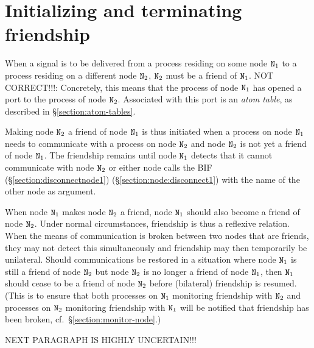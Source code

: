 \section{Initializing and terminating friendship}

\label{section:friendship}

When a signal is to be delivered from a process residing on some node ${\tt{\sl N}}_1$
to a process residing on a different node ${\tt{\sl N}}_2$, ${\tt{\sl N}}_2$ must be a friend
of ${\tt{\sl N}}_1$.  NOT CORRECT!!!:
Concretely, this means that the  process of
node ${\tt{\sl N}}_1$ has opened a port to the  process of
node ${\tt{\sl N}}_2$.  Associated with this port is an
\emph{atom table}, as
described in \S\ref{section:atom-tables}.

Making node ${\tt{\sl N}}_2$ a friend of node ${\tt{\sl N}}_1$ is thus initiated when
a process on node ${\tt{\sl N}}_1$ needs to communicate with a process on node ${\tt{\sl N}}_2$
and node ${\tt{\sl N}}_2$ is not yet a friend of node ${\tt{\sl N}}_1$.  The friendship
remains until node ${\tt{\sl N}}_1$ detects that it cannot communicate with node
${\tt{\sl N}}_2$ or either node calls the BIF
\ifOld {} (\S\ref{section:disconnectnode1}) \fi
\ifStd {}
(\S\ref{section:node:disconnect1}) \fi
with the name of the other
node as argument.

When node ${\tt{\sl N}}_1$ makes node ${\tt{\sl N}}_2$ a friend, node ${\tt{\sl N}}_1$ should also
become a friend of node ${\tt{\sl N}}_2$.  Under normal circumstances, friendship is thus
a reflexive relation.  When the means of communication is broken
between two nodes that are friends, they may not detect this simultaneously
and friendship may then temporarily be unilateral.  Should communications be restored
in a situation where node ${\tt{\sl N}}_1$ is still a friend of node ${\tt{\sl N}}_2$ but
node ${\tt{\sl N}}_2$ is no longer a friend of node ${\tt{\sl N}}_1$, then
${\tt{\sl N}}_1$ should cease to be a friend of node ${\tt{\sl N}}_2$ before (bilateral)
friendship is resumed.  (This is to ensure that both processes on ${\tt{\sl N}}_1$ monitoring
friendship with ${\tt{\sl N}}_2$ and processes on ${\tt{\sl N}}_2$ monitoring
friendship with ${\tt{\sl N}}_1$ will be notified that friendship has been broken,
cf.\ \S\ref{section:monitor-node}.)

NEXT PARAGRAPH IS HIGHLY UNCERTAIN!!!

